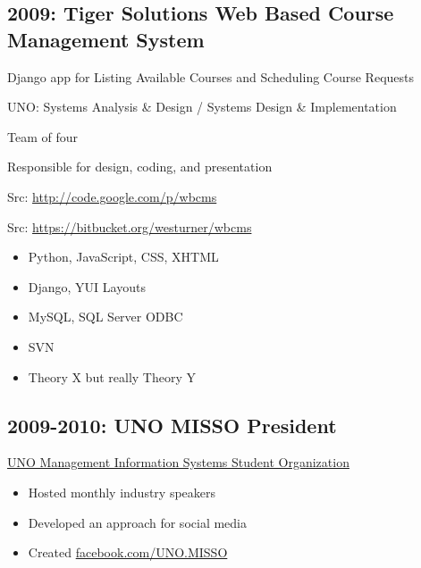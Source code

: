 \documentclass[letter,,openany,oneside]{sphinxhowto}
\begin{document}
\subsection{2009: Tiger Solutions Web Based Course Management System}
\label{resume:tiger-solutions-web-based-course-management-system}
\begin{DUlineblock}{0em}
\item[] Django app for Listing Available Courses and Scheduling Course Requests
\item[] UNO: Systems Analysis \& Design / Systems Design \& Implementation
\item[] Team of four
\item[] Responsible for design, coding, and presentation
\item[] Src: \url{http://code.google.com/p/wbcms}
\item[] Src: \url{https://bitbucket.org/westurner/wbcms}
\end{DUlineblock}
\begin{itemize}
\item {} 
Python, JavaScript, CSS, XHTML

\item {} 
Django, YUI Layouts

\item {} 
MySQL, SQL Server ODBC

\item {} 
SVN

\item {} 
Theory X but really Theory Y

\end{itemize}


\subsection{2009-2010: UNO MISSO President}
\label{resume:uno-misso-president}
\begin{DUlineblock}{0em}
\item[] \href{http://www.isqa.unomaha.edu/misso.htm}{UNO Management Information Systems Student Organization}
\end{DUlineblock}
\begin{itemize}
\item {} 
Hosted monthly industry speakers

\item {} 
Developed an approach for social media

\item {} 
Created \href{https://www.facebook.com/UNO.MISSO}{facebook.com/UNO.MISSO}

\end{itemize}
\end{document}
